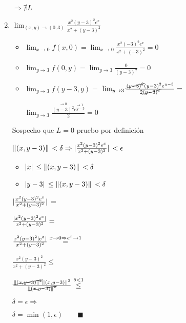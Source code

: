 \documentclass[../practica_03.tex]{subfiles}
\begin{document}
\begin{enumerate}
            $\Rightarrow \nexists L$

        \item $\lim_{(x,y)\to(0,3)} \frac{x^2(y-3)^2e^x}{x^2+(y-3)^2}$

            \begin{itemize}

                \item $\lim_{x\to0} f(x,0) = \lim_{x\to0} \frac{x^2(-3)^2e^x}{x^2+(-3)^2} = 0 $

                \item $\lim_{y\to3} f(0,y) = \lim_{y\to3} \frac{0}{(y-3)^2} = 0$

                \item $\lim_{y\to3} f(y-3,y) = $
                    $\lim_{y\to3} \frac{\cancel{(y-3)^2}(y-3)^2e^{y-3}}{2\cancel{(y-3)^2}} = $

                    $\lim_{y\to3} \frac{\stackrel{\to 0}{(y-3)^2}\stackrel{\to 1}{e^{y-3}}}{2} = 0$
            \end{itemize}

            Sospecho que $L = 0$ pruebo por definición

            $\norm*{(x,y-3)} < \delta \Rightarrow \abs*{\frac{x^2(y-3)^2e^x}{x^2+(y-3)^2}} < \epsilon $

            \begin{itemize}
                \item $\abs*{x} \leq \norm*{(x,y-3)} < \delta$
                \item $\abs*{y-3} \leq \norm*{(x,y-3)} < \delta$
            \end{itemize}

            $\abs*{\frac{x^2(y-3)^2e^x}{x^2+(y-3)^2}} = $

            $\frac{\abs*{x^2(y-3)^2e^x}}{x^2+(y-3)^2} = $

            $\frac{x^2(y-3)^2\abs*{e^x}}{x^2+(y-3)^2} \stackrel{x\to0\Rightarrow e^x \to 1}{=} $

            $\frac{x^2(y-3)^2}{x^2+(y-3)^2} \leq$
            
            $\frac{\cancel{\norm*{(x,y-3)}^2}\norm*{(x,y-3)}^2}{\cancel{\norm*{(x,y-3)}^2}} \stackrel{\delta < 1}{\leq}$

            $ \delta = \epsilon \Rightarrow$

            $ \delta = \min(1, \epsilon) \qquad \blacksquare$

    \end{enumerate}
\end{document}
